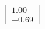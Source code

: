 \documentclass[preview]{standalone}
\begin{document}
\begin{align*}
\begin{bmatrix} 1.00 \\ -0.69 \end{bmatrix}
\end{align*}
\end{document}

